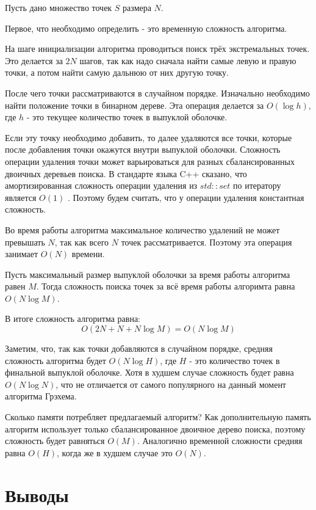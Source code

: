 Пусть дано множество точек $S$ размера $N$.

Первое, что необходимо определить - это временную сложность алгоритма.

На шаге инициализации алгоритма проводиться поиск трёх экстремальных точек. Это делается за $2 N$ шагов, так как надо сначала найти самые левую и правую точки, а потом найти самую дальнюю от них другую точку.

После чего точки рассматриваются в случайном порядке. Изначально необходимо найти положение точки в бинарном дереве. Эта операция делается за $O(\log h)$, где $h$ - это текущее количество точек в выпуклой оболочке.

Если эту точку необходимо добавить, то далее удаляются все точки, которые после добавления точки окажутся внутри выпуклой оболочки. Сложность операции удаления точки может варьироваться для разных сбалансированных двоичных деревьев поиска. В стандарте языка C++ сказано, что амортизированная сложность операции удаления из $std::set$ по итератору является $O(1)$ \cite{isoCppStd2017}. Поэтому будем считать, что у операции удаления константная сложность.

Во время работы алгоритма максимальное количество удалений не может превышать $N$, так как всего $N$ точек рассматривается. Поэтому эта операция занимает $O(N)$ времени.

Пусть максимальный размер выпуклой оболочки за время работы алгоритма равен $M$. Тогда сложность поиска точек за всё время работы алгоримта равна $O(N \log M)$.

В итоге сложность алгоритма равна:
\[
O(2 N + N + N \log M) = O(N \log M)
\]

Заметим, что, так как точки добавляются в случайном порядке, средняя сложность алгоритма будет $O(N \log H)$, где $H$ - это количество точек в финальной выпуклой оболочке. Хотя в худшем случае сложность будет равна $O(N \log N)$, что не отличается от самого популярного на данный момент алгоритма Грэхема.

Сколько памяти потребляет предлагаемый алгоритм? Как дополнительную память алгоритм использует только сбалансированное двоичное дерево поиска, поэтому сложность будет равняться $O(M)$. Аналогично временной сложности средняя равна $O(H)$, когда же в худшем случае это $O(N)$.


\section{Выводы} \label{subsect2_5}

